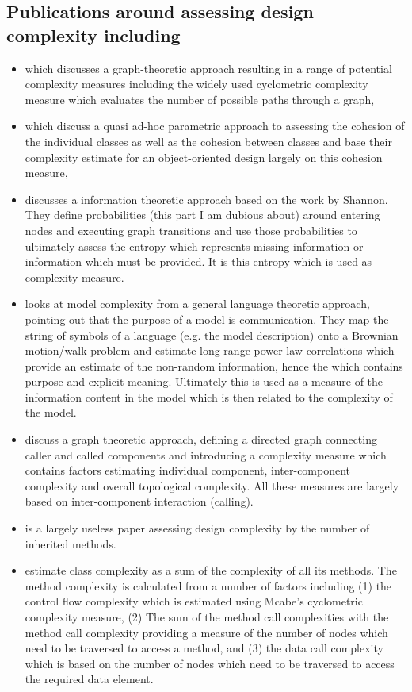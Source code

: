 \subsection{Publications around assessing design complexity including}
  \begin{itemize}
   \item \cite{mccabe_complexity_1976} which discusses a graph-theoretic approach resulting in a range of potential complexity measures including the widely used cyclometric complexity measure which evaluates the number of possible paths through a graph,
   \item \cite{tegarden_software_1995} which discuss a quasi ad-hoc parametric approach to assessing the cohesion of the individual classes as well as the cohesion between classes and base their complexity estimate for an object-oriented design largely on this cohesion measure,
   \item \cite{roca_entropy-based_1996} discusses a information theoretic approach based on the work by Shannon. They define probabilities (this part I am dubious about) around entering nodes and executing graph transitions and use those probabilities to ultimately assess the entropy which represents missing information or information which must be provided. It is this entropy which is used as complexity measure.
   \item \cite{podgorelec_estimating_2007} looks at model complexity from a general language theoretic approach, pointing out that the purpose of a model is communication. They map the string of symbols of a language (e.g. the model description) onto a Brownian motion/walk problem and estimate long range power law correlations which provide an estimate of the non-random information, hence the which contains purpose and explicit meaning. Ultimately this is used as a measure of the information content in the model which is then related to the complexity of the model.
   \item \cite{sengupta_measuring_2011} discuss a graph theoretic approach, defining a directed graph connecting caller and called components and introducing a complexity measure which contains factors estimating individual component, inter-component complexity and overall topological complexity. All these measures are largely based on inter-component interaction (calling).
   \item \cite{yadav_measuring_2009} is a largely useless paper assessing design complexity by the number of inherited methods.
   \item \cite{gill_new_2010} estimate class complexity as a sum of the complexity of all its methods. The method complexity is calculated from a number of factors including (1) the control flow complexity which is estimated using Mcabe's cyclometric complexity measure, (2) The sum of the method call complexities with the method call complexity providing a measure of the number of nodes which need to be traversed to access a method, and (3) the data call complexity which is based on the number of nodes which need to be traversed to access the required data element.

\end{itemize}
